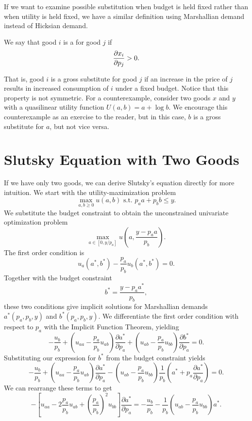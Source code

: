 If we want to examine possible substitution when budget is held fixed rather than when utility is held fixed, we have a similar definition using Marshallian demand instead of Hicksian demand.

\begin{definition*}
We say that good $i$ is a  for good $j$ if
$$\pdv{x_i}{p_j} > 0.$$
\end{definition*}
That is, good $i$ is a gross substitute for good $j$ if an increase in the price of $j$ results in increased consumption of $i$ under a fixed budget. Notice that this property is not symmetric. For a counterexample, consider two goods $x$ and $y$ with a quasilinear utility function $U(a, b) = a + \log b$. We encourage this counterexample as an exercise to the reader, but in this case, $b$ is a gross substitute for $a$, but not vice versa.

\section{Slutsky Equation with Two Goods}

If we have only two goods, we can derive Slutsky's equation directly for more intuition. We start with the utility-maximization problem 
$$
\max _{a, b \geq 0} u(a, b) \text { s.t. } p_{a} a+p_{b} b \leq y.
$$
We substitute the budget constraint to obtain the unconstrained univariate optimization problem 
$$
\max _{a \in\left[0, y / p_{a}\right]} u\left(a, \frac{y-p_{a} a}{p_{b}}\right).
$$
The first order condition is 
$$
u_{a}\left(a^{*}, b^{*}\right)-\frac{p_{a}}{p_{b}} u_{b}\left(a^{*}, b^{*}\right)=0.
$$
Together with the budget constraint 
$$
b^{*}=\frac{y-p_{a} a^{*}}{p_{b}},
$$
these two conditions give implicit solutions for Marshallian demands $a^*(p_a, p_b, y)$ and $b^*(p_a, p_b, y)$.
We differentiate the first order condition with respect to $p_a$ with the Implicit Function Theorem, yielding 
$$
-\frac{u_{b}}{p_{b}}+\left(u_{a a}-\frac{p_{a}}{p_{b}} u_{a b}\right) \frac{\partial a^{*}}{\partial p_{a}}+\left(u_{a b}-\frac{p_{a}}{p_{b}} u_{b b}\right) \frac{\partial b^{*}}{\partial p_{a}}=0.
$$
Substituting our expression for $b^*$ from the budget constraint yields 
$$
-\frac{u_{b}}{p_{b}}+\left(u_{a a}-\frac{p_{a}}{p_{b}} u_{a b}\right) \frac{\partial a^{*}}{\partial p_{a}}-\left(u_{a b}-\frac{p_{a}}{p_{b}} u_{b b}\right) \frac{1}{p_{b}}\left(a^{*}+p_{a} \frac{\partial a^{*}}{\partial p_{a}}\right)=0.
$$
We can rearrange these terms to get
$$
-\left[u_{a a}-2 \frac{p_{a}}{p_{b}} u_{a b}+\left(\frac{p_{a}}{p_{b}}\right)^{2} u_{b b}\right] \frac{\partial a^{*}}{\partial p_{a}}=-\frac{u_{b}}{p_{b}}-\frac{1}{p_{b}}\left(u_{a b}-\frac{p_{a}}{p_{b}} u_{b b}\right) a^{*}.
$$


